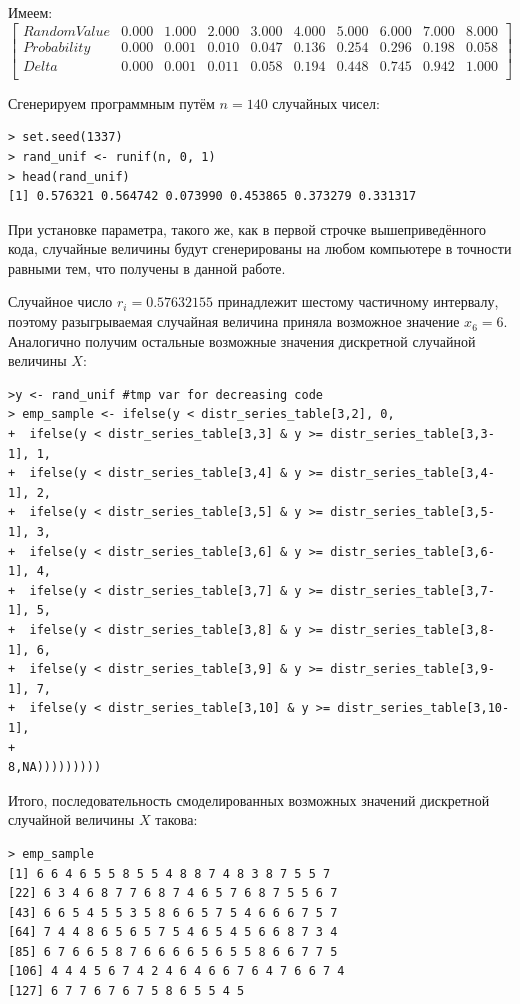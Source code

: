 \documentclass[14pt,a4paper]{scrartcl}
\begin{document}
Имеем:
\begin{equation*}
	\begin{bmatrix}{}
	Random Value & 0.000 & 1.000 & 2.000 & 3.000 & 4.000 & 5.000 & 6.000 & 7.000 & 8.000 \\ 
	Probability & 0.000 & 0.001 & 0.010 & 0.047 & 0.136 & 0.254 & 0.296 & 0.198 & 0.058 \\ 
	Delta & 0.000 & 0.001 & 0.011 & 0.058 & 0.194 & 0.448 & 0.745 & 0.942 & 1.000 \\ 
	\end{bmatrix}
\end{equation*}

Сгенерируем программным путём $n = 140$ случайных чисел:
\begin{lstlisting}
> set.seed(1337)
> rand_unif <- runif(n, 0, 1)
> head(rand_unif)
[1] 0.576321 0.564742 0.073990 0.453865 0.373279 0.331317
\end{lstlisting}
При установке параметра, такого же, как в первой строчке вышеприведённого кода, случайные величины будут сгенерированы на любом компьютере в точности равными тем, что получены в данной работе.

Случайное число $r_i = 0.57632155$ принадлежит шестому частичному интервалу, поэтому разыгрываемая случайная  величина приняла возможное значение $x_6 = 6$. Аналогично получим остальные возможные значения дискретной случайной величины $X$:

\begin{lstlisting}[basicstyle=\small]
>y <- rand_unif #tmp var for decreasing code
> emp_sample <- ifelse(y < distr_series_table[3,2], 0, 
+  ifelse(y < distr_series_table[3,3] & y >= distr_series_table[3,3-1], 1, 
+  ifelse(y < distr_series_table[3,4] & y >= distr_series_table[3,4-1], 2, 
+  ifelse(y < distr_series_table[3,5] & y >= distr_series_table[3,5-1], 3, 
+  ifelse(y < distr_series_table[3,6] & y >= distr_series_table[3,6-1], 4,
+  ifelse(y < distr_series_table[3,7] & y >= distr_series_table[3,7-1], 5,
+  ifelse(y < distr_series_table[3,8] & y >= distr_series_table[3,8-1], 6,
+  ifelse(y < distr_series_table[3,9] & y >= distr_series_table[3,9-1], 7,
+  ifelse(y < distr_series_table[3,10] & y >= distr_series_table[3,10-1], 
+                                                            8,NA)))))))))
\end{lstlisting}

Итого, последовательность смоделированных возможных значений дискретной случайной величины $X$ такова:
\begin{lstlisting}
> emp_sample
[1] 6 6 4 6 5 5 8 5 5 4 8 8 7 4 8 3 8 7 5 5 7
[22] 6 3 4 6 8 7 7 6 8 7 4 6 5 7 6 8 7 5 5 6 7
[43] 6 6 5 4 5 5 3 5 8 6 6 5 7 5 4 6 6 6 7 5 7
[64] 7 4 4 8 6 5 6 5 7 5 4 6 5 4 5 6 6 8 7 3 4
[85] 6 7 6 6 5 8 7 6 6 6 6 5 6 5 5 8 6 6 7 7 5
[106] 4 4 4 5 6 7 4 2 4 6 4 6 6 7 6 4 7 6 6 7 4
[127] 6 7 7 6 7 6 7 5 8 6 5 5 4 5
\end{lstlisting}
\end{document}
